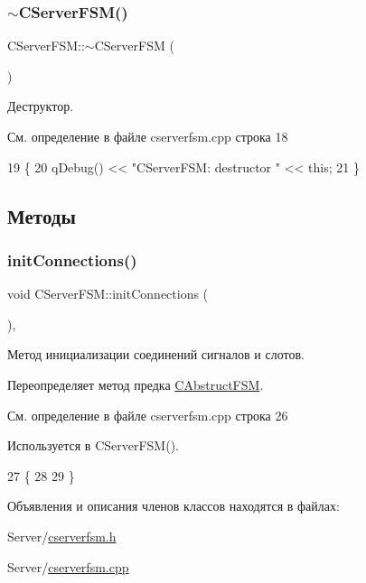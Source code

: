 \subsubsection{\texorpdfstring{$\sim$\+C\+Server\+F\+S\+M()}{~CServerFSM()}}
{\footnotesize\ttfamily C\+Server\+F\+S\+M\+::$\sim$\+C\+Server\+F\+SM (\begin{DoxyParamCaption}{ }\end{DoxyParamCaption})}



Деструктор. 



См. определение в файле cserverfsm.\+cpp строка 18


\begin{DoxyCode}
19 \{
20     qDebug() << \textcolor{stringliteral}{"CServerFSM: destructor "} << \textcolor{keyword}{this};
21 \}
\end{DoxyCode}


\subsection{Методы}
\hypertarget{class_c_server_f_s_m_ae0e6a994505c26e60b718af9989bea77}{}\label{class_c_server_f_s_m_ae0e6a994505c26e60b718af9989bea77} 
\subsubsection{\texorpdfstring{init\+Connections()}{initConnections()}}
{\footnotesize\ttfamily void C\+Server\+F\+S\+M\+::init\+Connections (\begin{DoxyParamCaption}{ }\end{DoxyParamCaption})\hspace{0.3cm}{\ttfamily [protected]}, {\ttfamily [virtual]}}



Метод инициализации соединений сигналов и слотов. 



Переопределяет метод предка \hyperlink{class_c_abstruct_f_s_m_a9d6f4659a08f3028f8c047243f8dcfc3}{C\+Abstruct\+F\+SM}.



См. определение в файле cserverfsm.\+cpp строка 26



Используется в C\+Server\+F\+S\+M().


\begin{DoxyCode}
27 \{
28 
29 \}
\end{DoxyCode}


Объявления и описания членов классов находятся в файлах\+:\begin{DoxyCompactItemize}
\item 
Server/\hyperlink{cserverfsm_8h}{cserverfsm.\+h}\item 
Server/\hyperlink{cserverfsm_8cpp}{cserverfsm.\+cpp}\end{DoxyCompactItemize}
